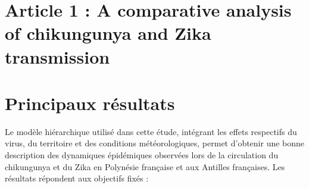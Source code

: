 \section[Article 1]{Article 1 : \guillemotleft A comparative analysis of chikungunya and Zika transmission\guillemotright}
\cleardoublepage

\cleardoublepage

\section{Principaux résultats}

Le modèle hiérarchique utilisé dans cette étude, intégrant les effets respectifs du virus, du territoire et des conditions météorologiques, permet d'obtenir une bonne description des dynamiques épidémiques observées lors de la circulation du chikungunya et du Zika en Polynésie française et aux Antilles françaises.
Les résultats répondent aux objectifs fixés :
